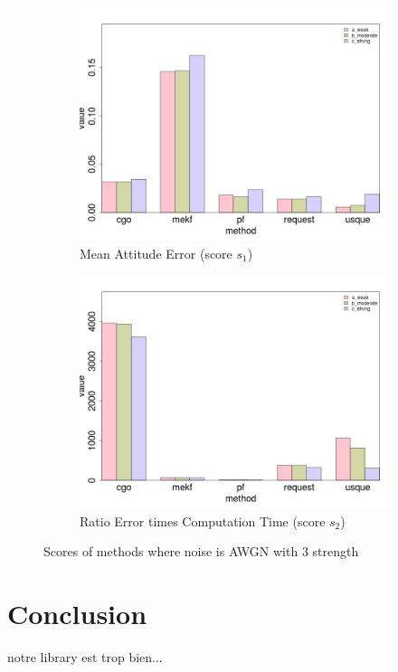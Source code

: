 \documentclass[conference]{IEEEtran}
\begin{document}
\begin{figure}[!h]

\begin{subfigure}{.5\textwidth}
  \centering
  \includegraphics[width=.85\linewidth]{images/histo_s1_add.png}
  \caption{Mean Attitude Error (score $s_1$)}
\end{subfigure}%
\begin{subfigure}{.5\textwidth}
  \centering
  \includegraphics[width=.85\linewidth]{images/histo_s2_add.png}
  \caption{Ratio Error times Computation Time (score $s_2$)}

\end{subfigure}
\caption{Scores of methods where noise is AWGN with 3 strength}

\end{figure}


\section{Conclusion}

notre library est trop bien...


\end{document}
